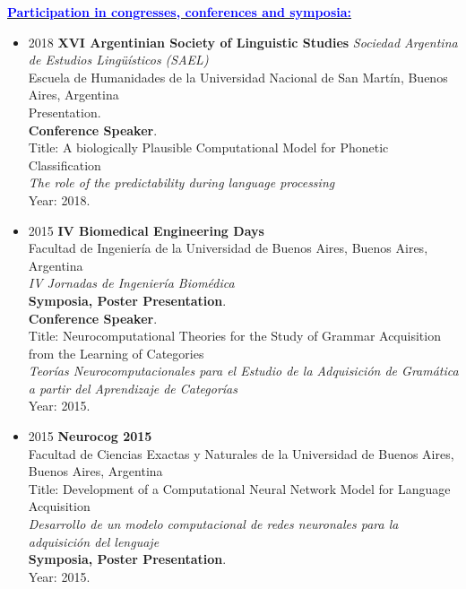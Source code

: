 \documentclass{article}
\newcommand{\statement}[1]{\par\medskip
  \underline{\textcolor{blue}{\textbf{#1:}}}\space
}
\begin{document}
\statement{Participation in congresses, conferences and symposia}
\begin{itemize}
	\item 2018 {\bf XVI Argentinian Society of Linguistic Studies} \emph{Sociedad Argentina de Estudios Lingüísticos (SAEL)}\\
{Escuela de Humanidades de la Universidad Nacional de San Mart\'in, Buenos Aires, Argentina}\\
Presentation.\\
\textbf{Conference Speaker}.\\
Title: A biologically Plausible Computational Model for Phonetic Classification\\
{\it The role of the predictability during language processing}\\
Year: 2018.\\
	\item 2015 {\bf IV Biomedical Engineering Days}\\
Facultad de Ingenier\'ia de la Universidad de Buenos Aires, Buenos Aires, Argentina\\
{\it IV Jornadas de Ingenier\'ia Biom\'edica}\\
\textbf{Symposia, Poster Presentation}.\\
\textbf{Conference Speaker}.\\
Title: Neurocomputational Theories for the Study of Grammar Acquisition from the Learning of Categories\\
{\it Teor\'ias Neurocomputacionales para el Estudio de la Adquisici\'on de Gram\'atica a partir del Aprendizaje de Categor\'ias}\\
Year: 2015.\\
\pagebreak
	\item 2015 {\bf Neurocog 2015}\\
Facultad de Ciencias Exactas y Naturales de la Universidad de Buenos Aires, Buenos Aires, Argentina\\
Title: Development of a Computational Neural Network Model for Language Acquisition\\
{\it Desarrollo de un modelo computacional de redes neuronales para la adquisici\'on del lenguaje}\\
\textbf{Symposia, Poster Presentation}.\\
Year: 2015.\\

\end{itemize}
 
\end{document}
